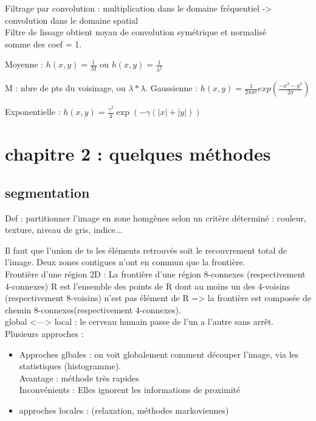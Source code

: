\documentclass[11pt]{article}
\begin{document}
Filtrage par convolution : multiplication dans le domaine fréquentiel -> convolution dans le domaine spatial\\

Filtre de lissage obtient noyau de convolution symétrique et normalisé\\
somme des coef = 1.


\vskip 0.5cm
Moyenne : $h(x, y) = \frac{1}{M}$ ou $h(x, y) = \frac{1}{\lambda^2}$

M : nbre de pts du voisinage, ou $\lambda * \lambda$.
\vslip 0.5cm
Gaussienne : $h(x, y) = \frac{1}{2\pi\sigma^2}exp(\frac{-x^2 - y^2}{2\sigma})$

\vskip 0.5cm
Exponentielle : $h(x, y) = \frac{\gamma^2}{4}\exp(-\gamma(|x| + |y|))$\\

\newpage
\section{chapitre 2 : quelques méthodes}
\subsection{segmentation}
Def : partitionner l'image en zone homgènes selon un critère déterminé : couleur, texture, niveau de gris, indice...

Il faut que l'union de ts les éléments retrouvés soit le recouvrement total de l'image. Deux zones contigues n'ont en commun que la frontière.\\
Frontière d'une région 2D : La frontière d'une région 8-connexes (respectivement 4-connexes) R est l'ensemble des points de R dont au moins un des 4-voisins (respectivement 8-voisins) n'est pas élément de R => la frontière est composée de chemin 8-connexes(respectivement 4-connexes).\\

global <---> local : le cerveau humain passe de l'un a l'autre sans arrêt.\\

Plusieurs approches :
\begin{itemize}
	\item Approches glbales : on voit globalement comment découper l'image, via les statistiques (histogramme). \\Avantage : méthode très rapides\\
		Inconvénients : Elles ignorent les informations de proximité
	\item approches locales : (relaxation, méthodes markoviennes)
\end{itemize}
\end{document}
